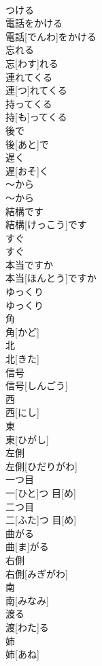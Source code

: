 \documentclass[8pt]{extreport}
\begin{document}
\begin{CJK}{UTF8}{min}
\\	つける
\\	電話をかける	
\\	電話[でんわ]をかける
\\	忘れる	
\\	忘[わす]れる
\\	連れてくる	
\\	連[つ]れてくる
\\	持ってくる	
\\	持[も]ってくる
\\	後で	
\\	後[あと]で
\\	遅く	
\\	遅[おそ]く
\\	〜から	
\\	〜から
\\	結構です	
\\	結構[けっこう]です
\\	すぐ	
\\	すぐ
\\	本当ですか	
\\	本当[ほんとう]ですか
\\	ゆっくり	
\\	ゆっくり
\\	角	
\\	角[かど]
\\	北	
\\	北[きた]
\\	信号	
\\	信号[しんごう]
\\	西	
\\	西[にし]
\\	東	
\\	東[ひがし]
\\	左側	
\\	左側[ひだりがわ]
\\	一つ目	
\\	一[ひと]つ 目[め]
\\	二つ目	
\\	二[ふた]つ 目[め]
\\	曲がる	
\\	曲[ま]がる
\\	右側	
\\	右側[みぎがわ]
\\	南	
\\	南[みなみ]
\\	渡る	
\\	渡[わた]る
\\	姉	
\\	姉[あね]

\end{CJK}
\end{document}
